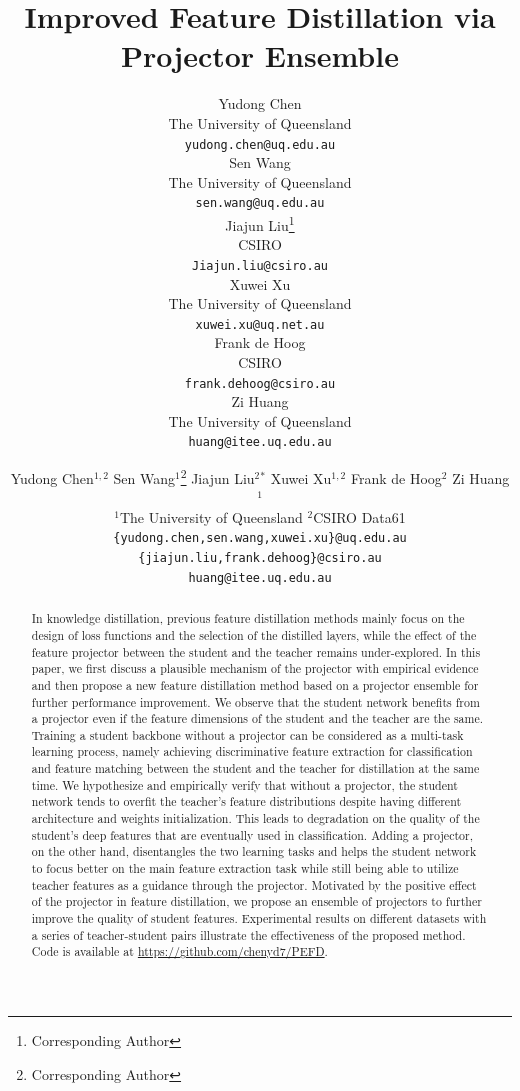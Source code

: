 \documentclass{article}
\title{Improved Feature Distillation via Projector Ensemble}
\author{%
  Yudong Chen \\
  The University of Queensland\\
  \texttt{yudong.chen@uq.edu.au} \\
  \And
  Sen Wang \\
  The University of Queensland \\
  \texttt{sen.wang@uq.edu.au} \\
  \AND
  Jiajun Liu\thanks{Corresponding Author} \\
  CSIRO \\
  \texttt{Jiajun.liu@csiro.au} \\
  \And
  Xuwei Xu \\
  The University of Queensland \\
  \texttt{xuwei.xu@uq.net.au} \\
  \AND
  Frank de Hoog \\
  CSIRO \\
  \texttt{frank.dehoog@csiro.au} \\
  \And
  Zi Huang \\
  The University of Queensland \\
  \texttt{huang@itee.uq.edu.au} \\
}
\author{%
Yudong Chen$^{1,2}$ \quad Sen Wang$^{1}$\thanks{Corresponding Author} \quad Jiajun Liu$^{2}$$^*$ \quad Xuwei Xu$^{1,2}$ \quad Frank de Hoog$^2$ \quad Zi Huang$^{1}$  \\
$^1$The University of Queensland \quad $^2$CSIRO Data61\\
\texttt{\{yudong.chen,sen.wang,xuwei.xu\}@uq.edu.au}\\
\texttt{\{jiajun.liu,frank.dehoog\}@csiro.au}\\
\texttt{huang@itee.uq.edu.au}
}
\begin{document}
\maketitle


\begin{abstract}
  In knowledge distillation, previous feature distillation methods mainly focus on the design of loss functions and the selection of the distilled layers, while the effect of the feature projector between the student and the teacher remains under-explored. In this paper, we first discuss a plausible mechanism of the projector with empirical evidence and then propose a new feature distillation method based on a projector ensemble for further performance improvement.
  We observe that the student network benefits from a projector even if the feature dimensions of the student and the teacher are the same.
  Training a student backbone without a projector can be considered as a multi-task learning process, namely achieving discriminative feature extraction for classification and feature matching between the student and the teacher for distillation at the same time. We hypothesize and empirically verify that without a projector, the student network tends to overfit the teacher's feature distributions despite having different architecture and weights initialization. This leads to degradation on the quality of the student's deep features that are eventually used in classification. Adding a projector, on the other hand, disentangles the two learning tasks and helps the student network to focus better on the main feature extraction task while still being able to utilize teacher features as a guidance through the projector.
  Motivated by the positive effect of the projector in feature distillation, we propose an ensemble of projectors to further improve the quality of student features. Experimental results on different datasets with a series of teacher-student pairs illustrate the effectiveness of the proposed method. Code is available at \url{https://github.com/chenyd7/PEFD}.
\end{abstract}
\end{document}

